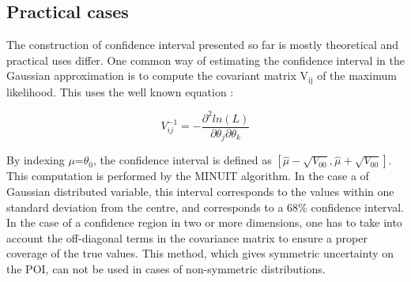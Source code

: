 \subsection{Practical cases}
\label{sec:org48c544d}

The construction of confidence interval presented so far is mostly theoretical and practical uses differ.
One common way of estimating the confidence interval in the Gaussian approximation is to compute the covariant matrix V\(_{\text{ij}}\) of the maximum likelihood.
This uses the well known equation :

\begin{equation}
V_{ij}^{-1} = - \frac{\partial^2ln(L)}{\partial \theta_j \partial \theta_k }
\end{equation}

By indexing \(\mu\)=\(\theta_{\text{0}}\), the confidence interval is defined as \([\hat{\mu}-\sqrt{V_{00}}, \hat{\mu}+\sqrt{V_{00}}]\).
This computation is performed by the MINUIT \cite{James:873119} algorithm.
In the case a of Gaussian distributed variable, this interval corresponds to the values within one standard deviation from the centre, and corresponds to a 68\% confidence interval.
In the case of a confidence region in two or more dimensions, one has to take into account the off-diagonal terms in the covariance matrix to ensure a proper coverage of the true values.
This method, which gives symmetric uncertainty on the POI, can not be used in cases of non-symmetric distributions.

